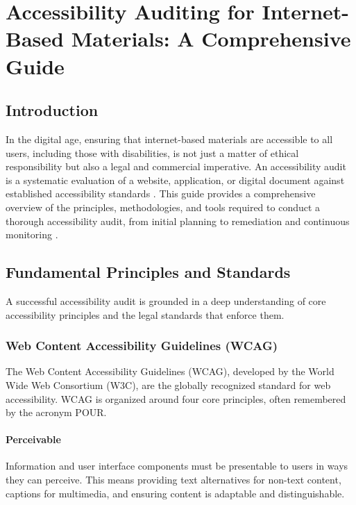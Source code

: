 \chapter{Accessibility Auditing for Internet-Based Materials: A Comprehensive Guide}
\label{chap:accessibility-auditing}

\section{Introduction}
\label{sec:intro-auditing}
In the digital age, ensuring that internet-based materials are accessible to all users, including those with disabilities, is not just a matter of ethical responsibility but also a legal and commercial imperative. An accessibility audit is a systematic evaluation of a website, application, or digital document against established accessibility standards \supercite{DisabilityRightsAuditing}. This guide provides a comprehensive overview of the principles, methodologies, and tools required to conduct a thorough accessibility audit, from initial planning to remediation and continuous monitoring \supercite{Lazar2015}.

\section{Fundamental Principles and Standards}
\label{sec:principles-standards}
A successful accessibility audit is grounded in a deep understanding of core accessibility principles and the legal standards that enforce them.

\subsection{Web Content Accessibility Guidelines (WCAG)}
\label{subsec:wcag}
The Web Content Accessibility Guidelines (WCAG), developed by the World Wide Web Consortium (W3C), are the globally recognized standard for web accessibility. WCAG is organized around four core principles, often remembered by the acronym POUR.
\supercite{WCAG21, WCAG2018}

\subsubsection{Perceivable}
\label{ssubsec:perceivable}
Information and user interface components must be presentable to users in ways they can perceive. This means providing text alternatives for non-text content, captions for multimedia, and ensuring content is adaptable and distinguishable.
\supercite{WCAGNonText2018}

